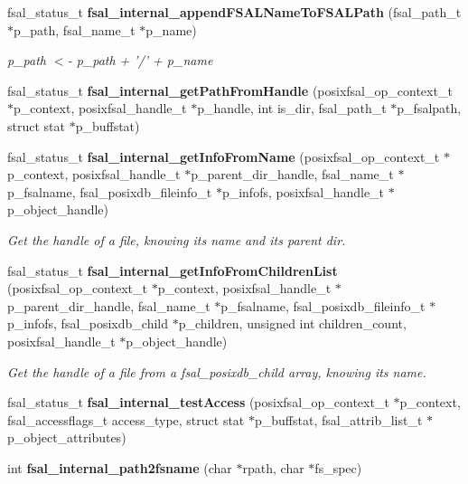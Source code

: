 \begin{DoxyCompactItemize}
\item 
fsal\_\-status\_\-t {\bf fsal\_\-internal\_\-appendFSALNameToFSALPath} (fsal\_\-path\_\-t $\ast$p\_\-path, fsal\_\-name\_\-t $\ast$p\_\-name)
\begin{DoxyCompactList}\small\item\em p\_\-path $<$-\/ p\_\-path + '/' + p\_\-name \item\end{DoxyCompactList}\item 
fsal\_\-status\_\-t {\bf fsal\_\-internal\_\-getPathFromHandle} (posixfsal\_\-op\_\-context\_\-t $\ast$p\_\-context, posixfsal\_\-handle\_\-t $\ast$p\_\-handle, int is\_\-dir, fsal\_\-path\_\-t $\ast$p\_\-fsalpath, struct stat $\ast$p\_\-buffstat)
\item 
fsal\_\-status\_\-t {\bf fsal\_\-internal\_\-getInfoFromName} (posixfsal\_\-op\_\-context\_\-t $\ast$p\_\-context, posixfsal\_\-handle\_\-t $\ast$p\_\-parent\_\-dir\_\-handle, fsal\_\-name\_\-t $\ast$p\_\-fsalname, fsal\_\-posixdb\_\-fileinfo\_\-t $\ast$p\_\-infofs, posixfsal\_\-handle\_\-t $\ast$p\_\-object\_\-handle)
\begin{DoxyCompactList}\small\item\em Get the handle of a file, knowing its name and its parent dir. \item\end{DoxyCompactList}\item 
fsal\_\-status\_\-t {\bf fsal\_\-internal\_\-getInfoFromChildrenList} (posixfsal\_\-op\_\-context\_\-t $\ast$p\_\-context, posixfsal\_\-handle\_\-t $\ast$p\_\-parent\_\-dir\_\-handle, fsal\_\-name\_\-t $\ast$p\_\-fsalname, fsal\_\-posixdb\_\-fileinfo\_\-t $\ast$p\_\-infofs, fsal\_\-posixdb\_\-child $\ast$p\_\-children, unsigned int children\_\-count, posixfsal\_\-handle\_\-t $\ast$p\_\-object\_\-handle)
\begin{DoxyCompactList}\small\item\em Get the handle of a file from a fsal\_\-posixdb\_\-child array, knowing its name. \item\end{DoxyCompactList}\item 
fsal\_\-status\_\-t {\bfseries fsal\_\-internal\_\-testAccess} (posixfsal\_\-op\_\-context\_\-t $\ast$p\_\-context, fsal\_\-accessflags\_\-t access\_\-type, struct stat $\ast$p\_\-buffstat, fsal\_\-attrib\_\-list\_\-t $\ast$p\_\-object\_\-attributes)\label{fsal__internal_8c_a341f79dc726a90c3ace23eff0ab3d279}

\item 
int {\bfseries fsal\_\-internal\_\-path2fsname} (char $\ast$rpath, char $\ast$fs\_\-spec)\label{fsal__internal_8c_a7a78f1a4c930c21959a26a3ac69d5e30}

\end{DoxyCompactItemize}

